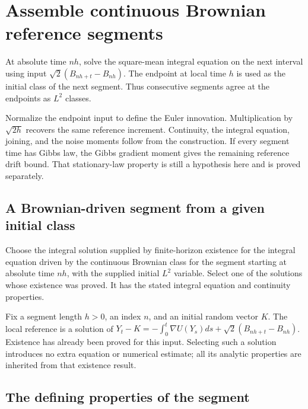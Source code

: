 \documentclass[11pt,a4paper]{article}
\begin{document}
\section{\texorpdfstring{Assemble continuous Brownian reference segments}{Assemble continuous Brownian reference segments}}


At absolute time \(nh\), solve the square-mean integral equation on the next interval using input \(\sqrt2(B_{nh+t}-B_{nh})\). The endpoint at local time \(h\) is used as the initial class of the next segment. Thus consecutive segments agree at the endpoints as \(L^2\) classes.



Normalize the endpoint input to define the Euler innovation. Multiplication by \(\sqrt{2h}\) recovers the same reference increment. Continuity, the integral equation, joining, and the noise moments follow from the construction. If every segment time has Gibbs law, the Gibbs gradient moment gives the remaining reference drift bound. That stationary-law property is still a hypothesis here and is proved separately.


\subsection{\texorpdfstring{A Brownian-driven segment from a given initial class}{A Brownian-driven segment from a given initial class}}


Choose the integral solution supplied by finite-horizon existence for the integral equation driven by the continuous Brownian class for the segment starting at absolute time \(nh\), with the supplied initial \(L^2\) variable. Select one of the solutions whose existence was proved. It has the stated integral equation and continuity properties.



Fix a segment length \(h>0\), an index \(n\), and an initial random vector \(K\). The local reference is a solution of \(Y_t-K=-\int_0^t\nabla U(Y_s)ds+\sqrt2(B_{nh+t}-B_{nh})\). Existence has already been proved for this input. Selecting such a solution introduces no extra equation or numerical estimate; all its analytic properties are inherited from that existence result.


\subsection{\texorpdfstring{The defining properties of the segment}{The defining properties of the segment}}
\end{document}

